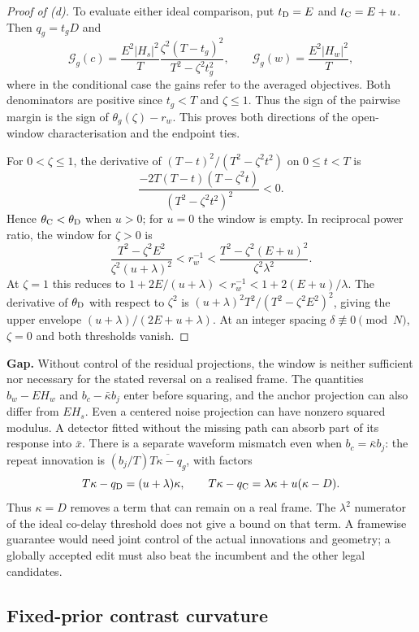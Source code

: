 \begin{proof}[Proof of \textup{(d)}]
To evaluate either ideal comparison, put $t_{\rm D}=E$ and
$t_{\rm C}=E+u$. Then $q_g=t_gD$ and
\[
 \mathcal G_g(c)
 =\frac{E^2|H_s|^2}{T}
   \frac{\zeta^2(T-t_g)^2}{T^2-\zeta^2t_g^2},
 \qquad
 \mathcal G_g(w)=\frac{E^2|H_w|^2}{T},
\]
where in the conditional case the gains refer to the averaged
objectives. Both denominators are positive since $t_g<T$ and
$\zeta\le1$. Thus the sign of the pairwise margin is the sign of
$\theta_g(\zeta)-r_w$. This proves both directions of the open-window
characterisation and the endpoint ties.

For $0<\zeta\le1$, the derivative of
$(T-t)^2/(T^2-\zeta^2t^2)$ on $0\le t<T$ is
\[
 \frac{-2T(T-t)(T-\zeta^2t)}{(T^2-\zeta^2t^2)^2}<0.
\]
Hence $\theta_{\rm C}<\theta_{\rm D}$ when $u>0$; for $u=0$ the
window is empty. In reciprocal power ratio, the window for
$\zeta>0$ is
\[
 \frac{T^2-\zeta^2E^2}{\zeta^2(u+\lambda)^2}
 <r_w^{-1}<
 \frac{T^2-\zeta^2(E+u)^2}{\zeta^2\lambda^2}.
\]
At $\zeta=1$ this reduces to
$1+2E/(u+\lambda)<r_w^{-1}<1+2(E+u)/\lambda$.
The derivative of $\theta_{\rm D}$ with respect to $\zeta^2$ is
$(u+\lambda)^2T^2/(T^2-\zeta^2E^2)^2$, giving the upper envelope
$(u+\lambda)/(2E+u+\lambda)$. At an integer spacing
$\delta\not\equiv0\pmod N$, $\zeta=0$ and both thresholds vanish.
\end{proof}

\noindent\textbf{Gap.}
Without control of the residual projections, the window is neither
sufficient nor necessary for the stated reversal on a realised
frame. The quantities $b_w-EH_w$ and $b_c-\bar\kappa b_j$ enter
before squaring, and the anchor projection can also differ from
$EH_s$. Even a centered noise projection can have nonzero squared
modulus. A detector fitted without the missing path can absorb part
of its response into $\bar x$. There is a separate waveform mismatch
even when $b_c=\bar\kappa b_j$: the repeat innovation is
$(b_j/T)\overline{T\kappa-q_g}$, with factors
\[
 T\kappa-q_{\rm D}=(u+\lambda)\kappa,\qquad
 T\kappa-q_{\rm C}=\lambda\kappa+u(\kappa-D).
\]
Thus $\kappa=D$ removes a term that can remain on a real frame.
The $\lambda^2$ numerator of the ideal co-delay threshold does not
give a bound on that term. A framewise guarantee would need joint
control of the actual innovations and geometry; a globally accepted
edit must also beat the incumbent and the other legal candidates.

\subsection{Fixed-prior contrast curvature}

